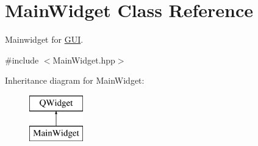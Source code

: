 \hypertarget{classMainWidget}{}\section{Main\+Widget Class Reference}
\label{classMainWidget}


Mainwidget for \mbox{\hyperlink{classGUI}{G\+UI}}.  




{\ttfamily \#include $<$Main\+Widget.\+hpp$>$}

Inheritance diagram for Main\+Widget\+:\begin{figure}[H]
\begin{center}
\leavevmode
\includegraphics[height=2.000000cm]{classMainWidget}
\end{center}
\end{figure}
